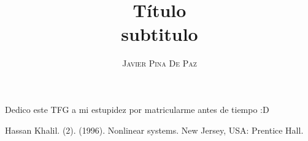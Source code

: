 \documentclass[a4paper,11pt]{book}
\title{\Huge \textbf{T\'itulo }   \\ \huge subtitulo}
\author{\textsc{Javier Pina De Paz}} %
\begin{document}
\frontmatter
\maketitle

\begin{dedication}
Dedico este TFG a mi estupidez por matricularme antes de tiempo :D
\end{dedication}

\tableofcontents

\mainmatter  %






\begin{thebibliography}{99}
 Hassan Khalil. (2). (1996). Nonlinear systems. New Jersey, USA: Prentice Hall. %
\end{thebibliography}
\end{document}
